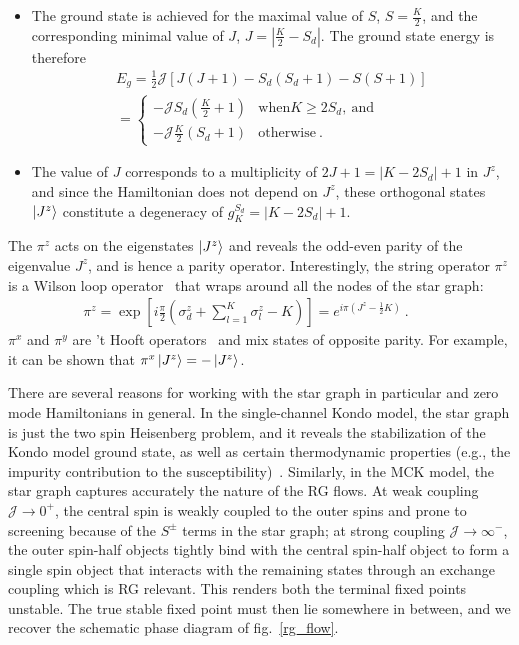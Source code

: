 \documentclass{iopart}
\begin{document}
\begin{itemize}
	\item The ground state is achieved for the maximal value of \(S\), \(S=\frac{K}{2}\), and the corresponding minimal value of \(J\), \(J = |\frac{K}{2} - S_d|\). The ground state energy is therefore 
\begin{eqnarray}
\label{ground-state-energy}
E_g = \frac{1}{2}\mathcal{J}\left[J(J+1) - S_d(S_d+1) - S(S+1)\right] \\
= \begin{cases}
	-\mathcal{J}S_d\left(\frac{K}{2} + 1\right) & \mathrm{ when } K \geq 2S_d, ~\mathrm{ and}\\
	-\mathcal{J}\frac{K}{2}\left(S_d + 1\right) & \mathrm{ otherwise}~.
\end{cases}
\end{eqnarray}
	\item The value of \(J\) corresponds to a multiplicity of \(2J+1 = |K - 2S_d|+1\) in \(J^z\), and since the Hamiltonian does not depend on \(J^z\), these orthogonal states \(\ket{J^z}\) constitute a degeneracy of \(g^{S_d}_K = |K - 2S_d|+1\).
\end{itemize}
The \(\pi^z\) acts on the eigenstates \(\ket{J^z}\) and reveals the odd-even parity of the eigenvalue \(J^z\), and is hence a parity operator. Interestingly, {the string operator \(\pi^z\) is a Wilson loop operator~\cite{fradkin2013field} that wraps around all the nodes of the star graph}:
\begin{eqnarray}
	\label{w_loop}
	\pi^z = \exp\left[i \frac{\pi}{2} \left(\sigma_d^z + \sum_{l=1}^K \sigma^z_l - K\right)\right] = e^{i \pi \left(J^z - \frac{1}{2}K\right)}~.\qquad
\end{eqnarray}
\(\pi^x\) and \(\pi^y\) are 't Hooft operators~\cite{fradkin2013field} and mix states of opposite parity. For example, it can be shown that \(\pi^x \ket{J^z} = -\ket{J^z}\).

There are several reasons for working with the star graph in particular and zero mode Hamiltonians in general.
In the single-channel Kondo model, the star graph is just the two spin Heisenberg problem, and it reveals the stabilization of the Kondo model ground state, as well as certain thermodynamic properties (e.g., the impurity contribution to the susceptibility)~\cite{varma_yafet_1976,yosida_1966,wilson1975renormalization,moca_zarand_2021,
varma_yafet_1976,kondo_urg}.
Similarly, in the MCK model, the star graph captures accurately the nature of the RG flows. At weak coupling \({\mathcal{J}} \to 0^+\), the central spin is weakly coupled to the outer spins and  prone to screening because of the \(S^\pm\) terms in the star graph; at strong coupling \({\mathcal{J}} \to \infty^-\), the outer spin-half objects tightly bind with the central spin-half object to form a single spin object that interacts with the remaining states through an exchange coupling which is RG relevant.
This renders both the terminal fixed points unstable.
The true stable fixed point must then lie somewhere in between, and we recover the schematic phase diagram of fig.~\ref{rg_flow}. 
\end{document}
